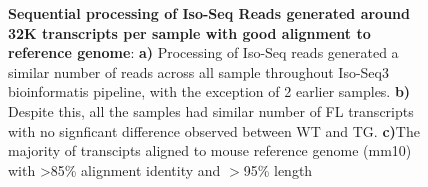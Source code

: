 \begin{figure}[htp]
\begin{center}
	\end{center}
	\captionsetup{width=0.95\textwidth}
	\caption[Sequential processing and alignment of reads from Whole Transcriptome Iso-Seq run]%
	{\textbf{Sequential processing of Iso-Seq Reads generated around 32K transcripts per sample with good alignment to reference genome}: \textbf{a)} Processing of Iso-Seq reads generated a similar number of reads across all sample throughout Iso-Seq3 bioinformatis pipeline, with the exception of 2 earlier samples. \textbf{b)} Despite this, all the samples had similar number of FL transcripts with no signficant difference observed between WT and TG. \textbf{c)}The majority of transcipts aligned to mouse reference genome (mm10) with >85\% alignment identity and $>$95\% length}
	\label{fig:isoseq_whole_processing}
\end{figure}

